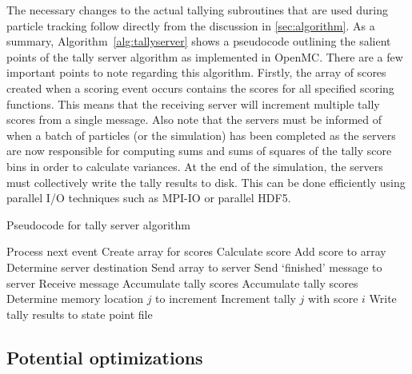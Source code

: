 \documentclass[3p]{elsarticle}
\begin{document}
The necessary changes to the actual tallying subroutines that are used during
particle tracking follow directly from the discussion in
\autoref{sec:algorithm}. As a summary, Algorithm~\ref{alg:tallyserver} shows a
pseudocode outlining the salient points of the tally server algorithm as
implemented in OpenMC. There are a few important points to note regarding this
algorithm. Firstly, the array of scores created when a scoring event occurs
contains the scores for all specified scoring functions. This means that the
receiving server will increment multiple tally scores from a single
message. Also note that the servers must be informed of when a batch of
particles (or the simulation) has been completed as the servers are now
responsible for computing sums and sums of squares of the tally score bins in
order to calculate variances. At the end of the simulation, the servers must
collectively write the tally results to disk. This can be done efficiently using
parallel I/O techniques such as MPI-IO or parallel HDF5.

\begin{algorithm}
  \caption{Pseudocode for tally server algorithm}
  \label{alg:tallyserver}
  \begin{algorithmic}
            \State Process next event
              \State Create array for scores
                \State Calculate score
                \State Add score to array
              \EndFor
              \State Determine server destination
              \State Send array to server
            \EndIf
          \EndWhile
        \EndFor
        \State Send `finished' message to server
      \EndFor
      \Loop
        \State Receive message
          \State Accumulate tally scores
          \State Accumulate tally scores
        \Else
          \State Determine memory location $j$ to increment
          \State Increment tally $j$ with score $i$
          \EndFor
        \EndIf
      \EndLoop
      \State Write tally results to state point file
    \EndIf
  \end{algorithmic}
\end{algorithm}

\subsection{Potential optimizations}
\end{document}
